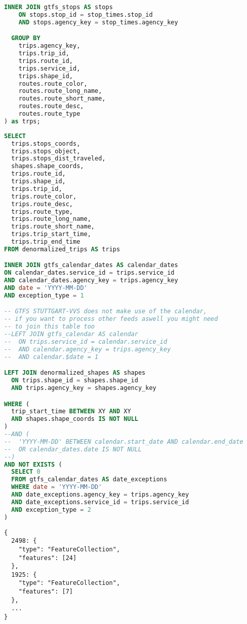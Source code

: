 \begin{newpage}
\begin{lstlisting}[captionpos=t, caption=Erstellen der denormalized\_shapes Tabelle, label=lst:denormalized_shapes, language=SQL]
  INNER JOIN gtfs_stops AS stops
    ON stops.stop_id = stop_times.stop_id
    AND stops.agency_key = stop_times.agency_key

  GROUP BY
    trips.agency_key,
    trips.trip_id,
    trips.route_id,
    trips.service_id,
    trips.shape_id,
    routes.route_color,
    routes.route_long_name,
    routes.route_short_name,
    routes.route_desc,
    routes.route_type
) as trps;
\end{lstlisting}

\begin{lstlisting}[captionpos=t, caption=Abfrage von Trips und dessen Polyline in einer Zeitspanne XY zu einem gegebenen Datum Z, label=lst:query_trips, language=SQL]
SELECT
  trips.stops_coords,
  trips.stops_object,
  trips.stops_dist_traveled,
  shapes.shape_coords,
  trips.route_id,
  trips.shape_id,
  trips.trip_id,
  trips.route_color,
  trips.route_desc,
  trips.route_type,
  trips.route_long_name,
  trips.route_short_name,
  trips.trip_start_time,
  trips.trip_end_time
FROM denormalized_trips AS trips

INNER JOIN gtfs_calendar_dates AS calendar_dates
ON calendar_dates.service_id = trips.service_id
AND calendar_dates.agency_key = trips.agency_key
AND date = 'YYYY-MM-DD'
AND exception_type = 1

-- GTFS STUTTGART-VVS does not make use of the calendar, 
-- if you want to process other feeds aswell you might need
-- to join this table too
--LEFT JOIN gtfs_calendar AS calendar
--  ON trips.service_id = calendar.service_id
--  AND calendar.agency_key = trips.agency_key
--  AND calendar.$date = 1

LEFT JOIN denormalized_shapes AS shapes
  ON trips.shape_id = shapes.shape_id
  AND trips.agency_key = shapes.agency_key

WHERE (
  trip_start_time BETWEEN XY AND XY
  AND shapes.shape_coords IS NOT NULL
)
--AND (
--  'YYYY-MM-DD' BETWEEN calendar.start_date AND calendar.end_date
--  OR calendar_dates.date IS NOT NULL
--)
AND NOT EXISTS (
  SELECT 0
  FROM gtfs_calendar_dates AS date_exceptions
  WHERE date = 'YYYY-MM-DD'
  AND date_exceptions.agency_key = trips.agency_key
  AND date_exceptions.service_id = trips.service_id
  AND exception_type = 2
)
\end{lstlisting}
  

\begin{lstlisting}[captionpos=t, caption=Geojson FeatureCollection als Antwort zu \texttt{/trips/:from,:to}, label=lst:geojson_featurecollection]
{
  2498: {
    "type": "FeatureCollection",
    "features": [24]
  },
  1925: {
    "type": "FeatureCollection",
    "features": [7]
  },
  ...
}
\end{lstlisting}



\end{newpage}
